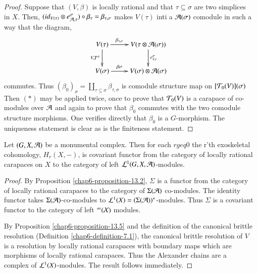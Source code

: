 \begin{proof}
Suppose that $(V, \beta)$ is locally rational and that $\tau \subseteq \sigma$ are two simplices in $X$. Then, $(id_{V(\tau)}\otimes e_{\mathcal{A}, \tau}^{\sigma})\circ \beta_{\tau}= \beta_{\tau, \sigma}$ makes $V(\tau)$ inti a $\mathcal{A}(\sigma)$ comodule in such a way that  the diagram,
\begin{equation*}
\vcenter{
\xymatrix{
V(\tau)\ar[d]_-{V, T^{\sigma}}\ar[r]^-{\beta_{\tau, \sigma}} & V(\tau \otimes \calA(\sigma))\ar[d]^-{e_{V, \tau}^{\sigma}}\\
V(\sigma)\ar[r]^-{\beta \sigma}& V(\sigma)\otimes \calA(\sigma)
}}
\end{equation*}
commutes. Thus $(\beta_{0})_{\sigma} = \coprod_{\tau \subseteq \sigma} \beta_{\tau, \sigma}$ is comodule structure map on $[\mathcal{T}_{0}(V)](\sigma)$ Then $(*)$ may be applied twice, once to prove that $\mathcal{T}_{0}(V)$ is a carapace of co-modules over $\mathcal{A}$ and again to prove that $\beta_{0}$ commutes with the two comodule structure morphisms. One verifies directly that $\beta_{0}$ is a $G$-morphism. The uniqueness statement is clear as is the finiteness statement.
\end{proof}

\begin{secprop}\label{chap6-proposition-13.6}
Let $(G, X, \mathcal{A})$ be a monumental complex. Then for each $r geq 0$ the r'th exoskeletal cohomology, $H_{r}(X, -)$, is covariant functor from the category of locally rational carapaces on $X$ to the category of left $\mathcal{L}^{1}(G, X, \mathcal{A})$-modules. 
\end{secprop}

\begin{proof}
By Proposition \ref{chap6-proposition-13.2}, $\Sigma$ is a functor from the category of locally rational carapaces to the category of $\Sigma(\mathcal{A})$ co-modules. The identity functor takes $\Sigma(\mathcal{A})$-co-modules to
$\mathcal{L}^{1}(X)= (\Sigma(\mathcal{A}))^{*}$-modules. Thus $\Sigma$ is a covariant functor to the category of left $\cal^{1}(X)$ modules.

By Proposition \ref{chap6-proposition-13.5} and the definition of the canonical brittle resolution (Definition \ref{chap6-definition-7.1}), the canonical brittle resolution of $V$ is a resolution by locally rational carapaces with boundary maps which are morphisms of locally rational carapaces. Thus the Alexander chains are a complex of $\mathcal{L}^{1}(X)$-modules. The result follows immediately. 
\end{proof}

